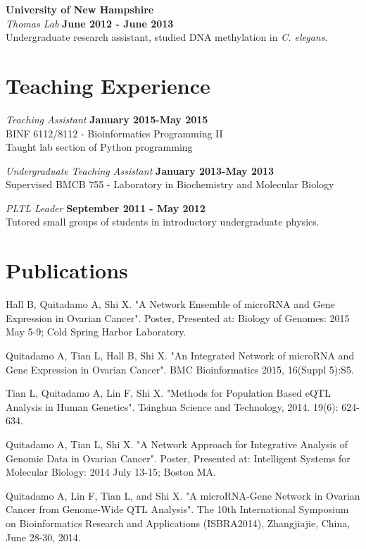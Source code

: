 \documentclass[margin,line]{res}
\begin{document}
\begin{resume}
{\bf University of New Hampshire}\\
{\em Thomas Lab} \hfill {\bf June 2012 - June 2013}\\
Undergraduate research assistant, studied DNA methylation in {\em C. elegans}.\\ 


\section{\sc Teaching Experience}

{\em Teaching Assistant} \hfill {\bf January 2015-May 2015}\\
BINF 6112/8112 - Bioinformatics Programming II\\
Taught lab section of Python programming

{\em Undergraduate Teaching Assistant} \hfill {\bf January 2013-May 2013}\\
Supervised BMCB 755 - Laboratory in Biochemistry and Molecular Biology

{\em PLTL Leader} \hfill {\bf September 2011 - May 2012}\\
Tutored small groups of students in introductory undergraduate physics.

\section{\sc Publications}
Hall B, Quitadamo A, Shi X. "A Network Ensemble of microRNA and Gene Expression in Ovarian Cancer". Poster, Presented at: Biology of Genomes: 2015 May 5-9; Cold Spring Harbor Laboratory. 

Quitadamo A, Tian L, Hall B, Shi X. "An Integrated Network of microRNA and Gene Expression in Ovarian Cancer". BMC Bioinformatics 2015, 16(Suppl 5):S5.

Tian L, Quitadamo A, Lin F, Shi X. "Methods for Population Based eQTL Analysis in Human Genetics". Tsinghua Science and Technology, 2014. 19(6): 624-634.

Quitadamo A, Tian L, Shi X. "A Network Approach for Integrative Analysis of Genomic Data in Ovarian Cancer". Poster, Presented at: Intelligent Systems for Molecular Biology: 2014 July 13-15; Boston MA.

Quitadamo A, Lin F, Tian L, and Shi X. "A microRNA-Gene Network in Ovarian Cancer from Genome-Wide QTL Analysis". The 10th International Symposium on Bioinformatics Research and Applications (ISBRA2014), Zhangjiajie, China, June 28-30, 2014.


\end{resume}
\end{document}
